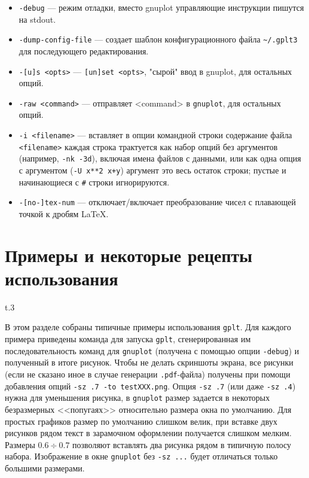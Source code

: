 \documentclass[12pt]{article}
\def\gplt{{\tt gplt}}
\def\gnuplot{{\tt gnuplot}}
\def\pdf{{\tt .pdf}}
\begin{document}
\begin{itemize}
\item \verb'-debug' --- режим отладки, вместо gnuplot управляющие инструкции пишутся на stdout.
\item \verb'-dump-config-file' --- создает шаблон конфигурационного файла \verb'~/.gplt3' для последующего редактирования.
\item \verb'-[u]s <opts>' --- \verb'[un]set <opts>', "сырой" ввод в gnuplot, для остальных опций.
\item \verb'-raw <command>' --- отправляет <command> в \gnuplot{}, для остальных опций.
\item \verb'-i <filename>' --- вставляет в опции командной строки содержание файла \verb'<filename>'
   каждая строка трактуется как набор опций без аргументов (например, \verb'-nk -3d'), 
   включая имена файлов с данными, или как одна опция с аргументом (\verb'-U x**2 x+y')
   аргумент это весь остаток строки; пустые и начинающиеся с \verb'#' строки игнорируются.
\item \verb'-[no-]tex-num' --- отключает/включает преобразование чисел с плавающей точкой к дробям \LaTeX.
\end{itemize}

\newpage
\section{Примеры и некоторые рецепты использования}
\begin{wrapfigure}[7]{t}{.3\textwidth}
  \vphantom{.}
  \vspace{-1cm}

\end{wrapfigure}
В этом разделе собраны типичные примеры использования \gplt.
Для каждого примера приведены команда для запуска \gplt, сгенерированная им последовательность команд
для \gnuplot{} (получена с помощью опции \verb'-debug') и полученный в итоге рисунок.
Чтобы не делать скриншоты экрана, все рисунки (если не сказано иное в случае генерации \pdf-файла) получены при помощи добавления
опций \verb'-sz .7 -to testXXX.png'. Опция \verb'-sz .7' (или даже \verb'-sz .4') нужна для уменьшения рисунка,
в \gnuplot{} размер задается в некоторых безразмерных <<попугаях>> относительно размера окна по умолчанию.
Для простых графиков размер по умолчанию слишком велик, при вставке двух рисунков рядом текст
в зарамочном оформлении получается слишком мелким. Размеры $0.6\div0.7$ позволяют вставлять два рисунка рядом в типичную полосу набора. 
Изображение в окне \gnuplot{} без \verb'-sz ...' будет отличаться только большими размерами.
\end{document}
